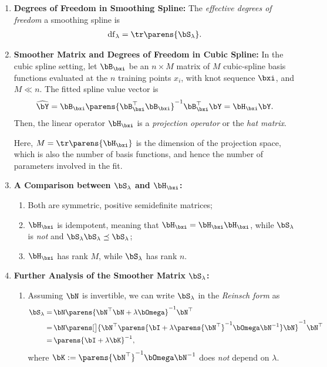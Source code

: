 \documentclass[12pt]{article}
\begin{document}
\begin{enumerate}[label=\textbf{\arabic*.}]
	\item \textbf{Degrees of Freedom in Smoothing Spline:} The \textit{effective degrees of freedom} a smoothing spline is 
	\begin{align*}
		\mathrm{df}_\lambda = \tr \parens{\bS_\lambda}. 
	\end{align*}
	
	\item \textbf{Smoother Matrix and Degrees of Freedom in Cubic Spline:} In the cubic spline setting, let $\bB_{\bxi}$ be an $n \times M$ matrix of $M$ cubic-spline basis functions evaluated at the $n$ training points $x_i$, with knot sequence $\bxi$, and $ M \ll n$. The fitted spline value vector is
	\begin{align*}
		\widehat{\bY} = \bB_{\bxi} \parens{\bB_{\bxi}^\top \bB_{\bxi}}^{-1} \bB_{\bxi}^\top \bY = \bH_{\bxi} \bY. 
	\end{align*}
	Then, the linear operator $ \bH_{\bxi} $ is a \emph{projection operator} or the \emph{hat matrix}. 
	
	Here, $M = \tr \parens{\bH_{\bxi}}$ is the dimension of the projection space, which is also the number of basis functions, and hence the number of parameters involved in the fit. 
	
	\item \textbf{A Comparison between $\bS_{\lambda}$ and $\bH_{\bxi}$:}
	\begin{enumerate}
		\item Both are symmetric, positive semidefinite matrices; 
		\item $\bH_{\bxi}$ is idempotent, meaning that $\bH_{\bxi} = \bH_{\bxi} \bH_{\bxi}$, while $\bS_\lambda$ is \emph{not} and $\bS_\lambda \bS_\lambda \preceq \bS_\lambda$; 
		\item $\bH_{\bxi}$ has rank $M$, while $\bS_\lambda$ has rank $n$. 
	\end{enumerate}
	
	\item \textbf{Further Analysis of the Smoother Matrix $\bS_\lambda$:} 
	\begin{enumerate}
		\item Assuming $\bN$ is invertible, we can write $\bS_{\lambda}$ in the \textit{Reinsch form} as 
		\begin{align*}
			\bS_{\lambda} = & \, \bN \parens{\bN^\top \bN + \lambda \bOmega }^{-1} \bN^\top \\
			= & \, \bN \parens[\big]{\bN^\top \parens{\bI + \lambda \parens{ \bN^\top }^{-1} \bOmega \bN^{-1}} \bN}^{-1} \bN^\top  \\
			= & \, \parens{\bI + \lambda \bK}^{-1}, 
		\end{align*}
		where $\bK := \parens{ \bN^\top }^{-1} \bOmega \bN^{-1}$ does \emph{not} depend on $\lambda$. 
		

\end{enumerate}
\end{enumerate}
\end{document}
